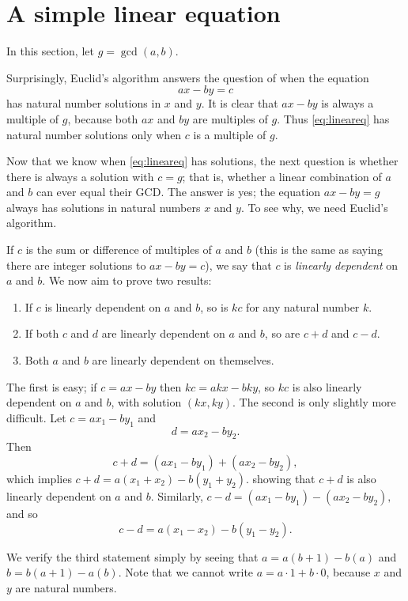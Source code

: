 \documentclass[a4paper,twocolumn]{article}
\begin{document}
\section*{A simple linear equation}

In this section, let $g=\gcd(a,b).$

Surprisingly, Euclid's algorithm answers the question of when the equation
\begin{equation}ax-by=c\label{eq:lineareq}\end{equation} has natural number solutions in $x$ and $y$. It is clear that $ax-by$
is always a multiple of $g$, because both $ax$ and $by$ are multiples of $g$.
Thus \eqref{eq:lineareq} has natural number solutions only when $c$ is a multiple of $g$.

Now that we know when \eqref{eq:lineareq} has solutions, the next question is whether
there is always a solution with $c=g$; that is, whether a linear combination of $a$ and $b$
can ever equal their GCD. The answer is yes; the equation $ax-by=g$ always has solutions
in natural numbers $x$ and $y$. To see why, we need Euclid's algorithm.

If $c$ is the sum or difference of multiples of $a$ and $b$ (this is the same
as saying there are integer solutions to $ax-by=c$), we say that $c$
is \emph{linearly dependent} on $a$ and $b$. We now aim to prove two results:
\begin{enumerate}
\item If $c$ is linearly dependent on $a$ and $b$, so is $kc$ for any natural number $k$.
\item If both $c$ and $d$ are linearly dependent on $a$ and $b$, so are $c+d$ and $c-d$.
\item Both $a$ and $b$ are linearly dependent on themselves.
\end{enumerate}
The first is easy; if $c=ax-by$ then $kc=akx-bky$, so $kc$ is also linearly dependent
on $a$ and $b$, with solution $(kx,ky)$. The second is only slightly more difficult. 
Let \(c=ax_1-by_1\) and $$d=ax_2-by_2.$$ Then $$c+ d=(ax_1-by_1)+ (ax_2-by_2),$$
which implies \(c+d=a(x_1+x_2)-b(y_1+y_2).\) showing that $c+d$ is also linearly dependent
on $a$ and $b$. Similarly, \(c-d=(ax_1-by_1)-(ax_2-by_2), \) and so $$c-d=a(x_1-x_2)-b(y_1-y_2).$$

We verify the third statement simply by seeing that $a=a(b+1)-b(a)$ and $b=b(a+1)-a(b)$. 
Note that we cannot write $a=a\cdot1+b\cdot0$, because $x$ and $y$
are natural numbers.
\end{document}
